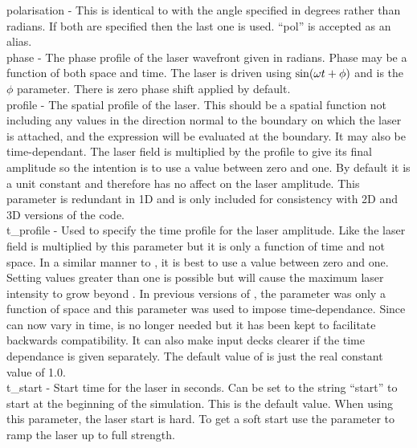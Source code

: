 {\emphtext polarisation} - This is identical to 
  with the angle specified in degrees rather than radians. If both are specified
  then the last one is used. ``pol'' is accepted as an alias.\\

{\emphtext phase} - The phase profile of the laser wavefront given in radians.
  Phase may be a function of both space and time. The laser is driven using
  ${\rm{sin}}(\omega t + \phi)$ and  is the $\phi$ parameter.
  There is zero phase shift applied by default.\\

{\emphtext profile} - The spatial profile of the laser. This should be a
  spatial function not including any values in the direction normal to the
  boundary on which the laser is attached, and the expression will be
  evaluated at the boundary. It may also be time-dependant.
  The laser field is multiplied by the profile to give
  its final amplitude so the intention is to use a value between zero and one.
  By default it is a unit constant and therefore has no affect on the laser
  amplitude. This parameter is redundant in 1D and is
  only included for consistency with 2D and 3D versions of the code.\\

{\emphtext t\_profile} - Used to specify the time profile for the laser
  amplitude. Like  the laser field is multiplied by
  this parameter but it is only a function of time and not space.
  In a similar manner to , it is best to use a value
  between zero and one.  Setting values greater than one is possible but will
  cause the maximum laser intensity to grow beyond .
  In previous
  versions of {\EPOCH}, the  parameter was only a function
  of space and this parameter was used to impose time-dependance. Since
   can now vary in time,  is no
  longer needed but it has been kept to facilitate backwards compatibility. It
  can also make input decks clearer if the time dependance is given separately.
  The default value of  is just the real constant
  value of 1.0.\\

{\emphtext t\_start} - Start time for the laser in seconds. Can be set to the
  string ``start'' to start at the beginning of the simulation. This is the
  default value. When using this parameter, the laser start is hard. To get a
  soft start use the  parameter to ramp the laser up to
  full strength.\\

